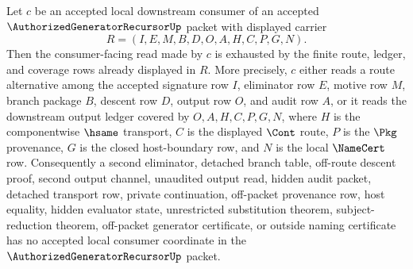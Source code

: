 \begin{lemma}
\label{lem:authorized-generator-recursor-route-totality-local-downstream-coverage}
Let $c$ be an accepted local downstream consumer of an accepted $\AuthorizedGeneratorRecursorUp$ packet with displayed carrier
$$
R=(I,E,M,B,D,O,A,H,C,P,G,N).
$$
Then the consumer-facing read made by $c$ is exhausted by the finite route, ledger, and coverage rows already displayed in $R$. More precisely, $c$ either reads a route alternative among the accepted signature row $I$, eliminator row $E$, motive row $M$, branch package $B$, descent row $D$, output row $O$, and audit row $A$, or it reads the downstream output ledger covered by $O,A,H,C,P,G,N$, where $H$ is the componentwise $\hsame$ transport, $C$ is the displayed $\Cont$ route, $P$ is the $\Pkg$ provenance, $G$ is the closed host-boundary row, and $N$ is the local $\NameCert$ row. Consequently a second eliminator, detached branch table, off-route descent proof, second output channel, unaudited output read, hidden audit packet, detached transport row, private continuation, off-packet provenance row, host equality, hidden evaluator state, unrestricted substitution theorem, subject-reduction theorem, off-packet generator certificate, or outside naming certificate has no accepted local consumer coordinate in the $\AuthorizedGeneratorRecursorUp$ packet.
\end{lemma}
